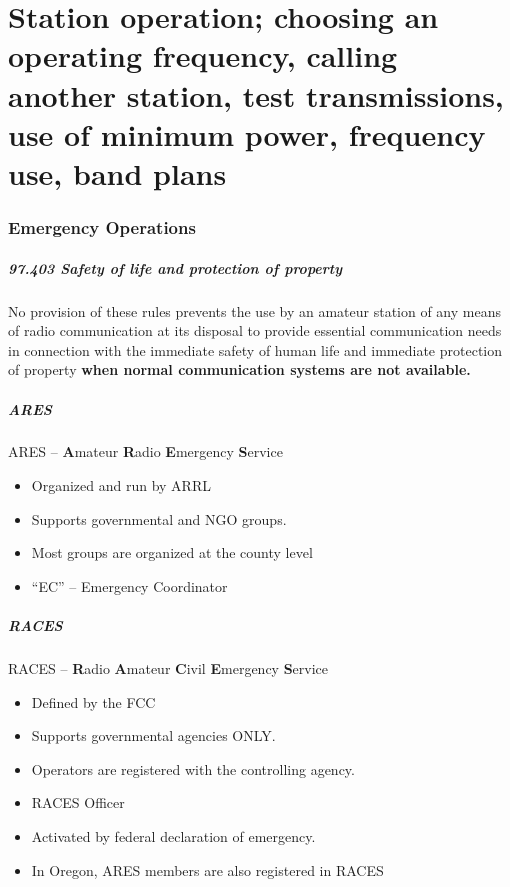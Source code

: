 \documentclass[10pt, handout]{beamer}
\begin{document}
\part{Station operation; choosing an operating frequency, calling another station, test transmissions, use of minimum power, frequency use, band plans}

\section{Emergency Operations}

\begin{frame}
\frametitle{97.403 Safety of life and protection of property}
No provision of these rules prevents the use by an amateur station of any means of radio communication at its disposal to provide essential communication needs in connection with the immediate safety of human life and immediate protection of property \textbf<2->{when normal communication systems are not available.}
\end{frame}

\begin{frame}
\frametitle{ARES}
ARES – \textbf{A}mateur \textbf{R}adio \textbf{E}mergency \textbf{S}ervice
\begin{itemize}
\item Organized and run by ARRL
\item Supports governmental and NGO groups.
\item Most groups are organized at the county level
\item “EC” – Emergency Coordinator
\end{itemize}
\end{frame}

\begin{frame}
\frametitle{RACES}
RACES – \textbf{R}adio \textbf{A}mateur \textbf{C}ivil \textbf{E}mergency \textbf{S}ervice
\begin{itemize}
\item Defined by the FCC
\item Supports governmental agencies ONLY.
\item Operators are registered with the controlling agency. 
\item RACES Officer
\item Activated by federal declaration of emergency. 
\item In Oregon, ARES members are also registered in RACES
\end{itemize}
\end{frame}
\end{document}
